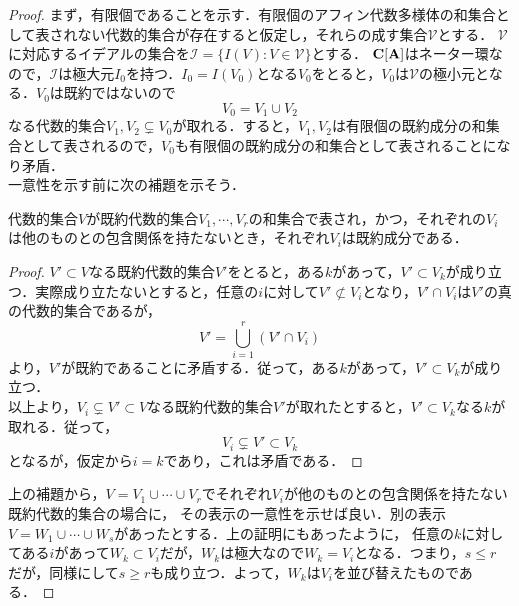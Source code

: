 \documentclass{myclass}
\begin{document}
\begin{proof}
  まず，有限個であることを示す．有限個のアフィン代数多様体の和集合として表されない代数的集合が存在すると仮定し，それらの成す集合$\mathscr{V}$とする．
  $\mathscr{V}$に対応するイデアルの集合を$\mathscr{I} = \{I(V) : V\in \mathscr{V}\}$とする．
  $\mathbf{C}[\mathbf{A}]$はネーター環なので，$\mathscr{I}$は極大元$I_0$を持つ．$I_0 = I(V_0)$となる$V_0$をとると，$V_0$は$\mathscr{V}$の極小元となる．$V_0$は既約ではないので
  \begin{equation*}
    V_0 = V_1 \cup V_2
  \end{equation*}
  なる代数的集合$V_1,V_2 \subsetneq V_0$が取れる．すると，$V_1,V_2$は有限個の既約成分の和集合として表されるので，$V_0$も有限個の既約成分の和集合として表されることになり矛盾．\\
  一意性を示す前に次の補題を示そう．
  \begin{lemma}
    代数的集合$V$が既約代数的集合$V_1,\cdots,V_r$の和集合で表され，かつ，それぞれの$V_i$は他のものとの包含関係を持たないとき，それぞれ$V_i$は既約成分である．
  \end{lemma}
  \begin{proof}
    $V' \subset V$なる既約代数的集合$V'$をとると，ある$k$があって，$V'\subset V_k$が成り立つ．実際成り立たないとすると，任意の$i$に対して$V' \not\subset V_i$となり，$V'\cap V_i$は$V'$の真の代数的集合であるが，
    \begin{equation*}
      V' = \bigcup_{i = 1}^{r} (V' \cap V_i)
    \end{equation*}
    より，$V'$が既約であることに矛盾する．従って，ある$k$があって，$V'\subset V_k$が成り立つ．\\
    以上より，$V_i\subsetneq V' \subset V$なる既約代数的集合$V'$が取れたとすると，$V'\subset V_k$なる$k$が
    取れる．従って，
    \begin{equation*}
      V_i \subsetneq V' \subset V_k
    \end{equation*}
    となるが，仮定から$i = k$であり，これは矛盾である．
  \end{proof}
  上の補題から，$V= V_1\cup \cdots \cup V_r$でそれぞれ$V_i$が他のものとの包含関係を持たない既約代数的集合の場合に，
  その表示の一意性を示せば良い．別の表示$V= W_1 \cup \cdots \cup W_s$があったとする．上の証明にもあったように，
  任意の$k$に対してある$i$があって$W_k \subset V_i$だが，$W_k$は極大なので$W_k = V_i$となる．つまり，$s\leq r$
  だが，同様にして$s \geq r$も成り立つ．よって，$W_k$は$V_i$を並び替えたものである．
\end{proof}
\end{document}

